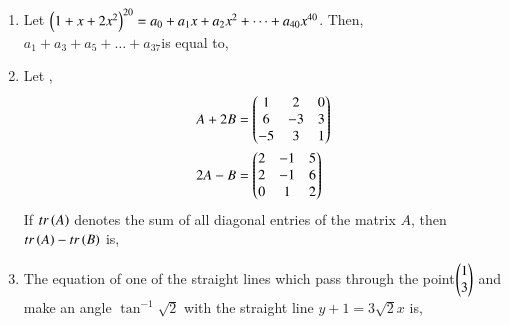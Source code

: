 \documentclass[journal]{IEEEtran}
\begin{document}
\begin{enumerate}
\begin{enumerate}
		\end{enumerate}
	\item Let $\left(1+x+2x^2\right)^{20}=a_0+a_1x+a_2x^2+\dots+a_{40}x^{40}$. Then, $a_1+a_3+a_5+\dots+a_{37}$is equal to,
		\begin{enumerate}
		\end{enumerate}
	\item Let ,
		\begin{align*}
			&A+2B=\begin{pmatrix}1&2&0\\6&-3&3\\-5&3&1\end{pmatrix}\\
			&2A-B=\begin{pmatrix}2&-1&5\\2&-1&6\\0&1&2\end{pmatrix}
		\end{align*}
		If $tr\left(A\right)$ denotes the sum of all diagonal entries of the matrix $A$, then $tr\left(A\right)-tr\left(B\right)$ is,
		\begin{enumerate}
				\begin{multicols}{2}
					\item $0$
				\columnbreak
					\item $1$
				\end{multicols}
				\begin{multicols}{2}
					\item $2$
				\columnbreak
					\item $3$
				\end{multicols}
		\end{enumerate}
	\item The equation of one of the straight lines which pass through the point$\begin{pmatrix}1\\3\end{pmatrix}$ and make an angle $\tan^{-1}\sqrt{2}$ with the straight line $y+1=3\sqrt{2}x$ is,
		\begin{enumerate}

\end{enumerate}
\end{enumerate}
\end{document}
